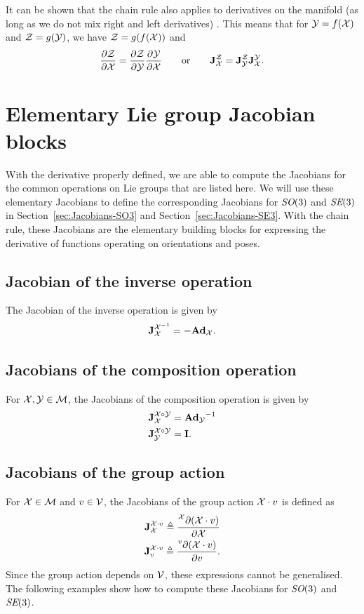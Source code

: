 It can be shown that the chain rule also applies to derivatives on the manifold (as long as we do not mix right and left derivatives) \cite{SolaARobotics}.
This means that for $\mathcal{Y} = f(\mathcal{X})$ and $\mathcal{Z} = g(\mathcal{Y})$, we have $\mathcal{Z} = g(f(\mathcal{X}))$ and
\begin{equation}
  \frac{\partial\mathcal{Z}}{\partial\mathcal{X}} = \frac{\partial\mathcal{Z}}{\partial\mathcal{Y}} \frac{\partial\mathcal{Y}}{\partial\mathcal{X}} \quad\quad \text{or} \quad\quad {{\boldsymbol{\mathbf{J}}}^{\mathcal{Z}}_{\mathcal{X}}} = {{\boldsymbol{\mathbf{J}}}^{\mathcal{Z}}_{\mathcal{Y}}} {{\boldsymbol{\mathbf{J}}}^{\mathcal{Y}}_{\mathcal{X}}}.
\end{equation}

\section{Elementary Lie group Jacobian blocks} \label{sec:elem-lie-blocks}
With the derivative properly defined, we are able to compute the Jacobians for the common operations on Lie groups that are listed here.
We will use these elementary Jacobians to define the corresponding Jacobians for $\textit{SO}(3)$ and $\textit{SE}(3)$ in Section~\ref{sec:Jacobians-SO3} and Section~\ref{sec:Jacobians-SE3}.
With the chain rule, these Jacobians are the elementary building blocks for expressing the derivative of functions operating on orientations and poses. 

\subsection{Jacobian of the inverse operation}
The Jacobian of the inverse operation is given by
\begin{equation} \label{eq:inverse-lie-jacobian}
  {{\boldsymbol{\mathbf{J}}}^{\mathcal{X}^{-1}}_{\mathcal{X}}} = -\boldsymbol{\mathbf{Ad}}_{\mathcal{X}}.
\end{equation}

\subsection{Jacobians of the composition operation}
For $\mathcal{X}, \mathcal{Y} \in \mathcal{M}$, the Jacobians of the composition operation is given by
\begin{align}
  {{\boldsymbol{\mathbf{J}}}^{\mathcal{X}\circ \mathcal{Y}}_{\mathcal{X}}} &= {\boldsymbol{\mathbf{Ad}}_{\mathcal{Y}}}^{-1}\\
  {{\boldsymbol{\mathbf{J}}}^{\mathcal{X} \circ \mathcal{Y}}_{\mathcal{Y}}} &= {\boldsymbol{\mathbf{I}}}.
\end{align}

\subsection{Jacobians of the group action}
For $\mathcal{X} \in \mathcal{M}$ and $v \in \mathcal{V}$, the Jacobians of the group action $\mathcal{X} \cdot v$ is defined as
\begin{align}
  {{\boldsymbol{\mathbf{J}}}^{\mathcal{X}\cdot v}_{\mathcal{X}}} \triangleq \frac{\prescript{\mathcal{X}}{}{\partial}(\mathcal{X} \cdot v)}{\partial \mathcal{X}}\\
  {{\boldsymbol{\mathbf{J}}}^{\mathcal{X} \cdot v}_{v}} \triangleq \frac{\prescript{v}{}{\partial}(\mathcal{X} \cdot v)}{\partial v}.
\end{align}
Since the group action depends on $\mathcal{V}$, these expressions cannot be generalised.
The following examples show how to compute these Jacobians for $\textit{SO}(3)$ and $\textit{SE}(3)$.

